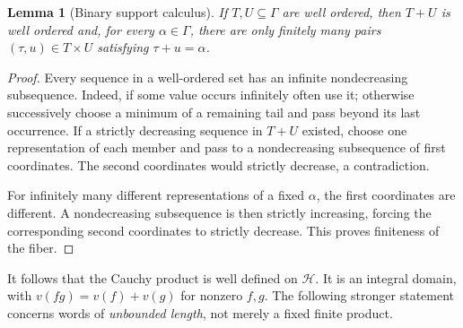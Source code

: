 \documentclass[11pt,a4paper]{article}
\newtheorem{lemma}[theorem]{Lemma}
\theoremstyle{definition}
\theoremstyle{remark}
\newcommand{\HH}{\mathscr H}
\begin{document}
\begin{lemma}[Binary support calculus]\label{lem:binary}
If $T,U\subseteq\Gamma$ are well ordered, then $T+U$ is well ordered and,
for every $\alpha\in\Gamma$, there are only finitely many pairs
$(\tau,u)\in T\times U$ satisfying $\tau+u=\alpha$.
\end{lemma}
\begin{proof}
Every sequence in a well-ordered set has an infinite nondecreasing
subsequence. Indeed, if some value occurs infinitely often use it; otherwise
successively choose a minimum of a remaining tail and pass beyond its last
occurrence. If a strictly decreasing sequence in $T+U$ existed, choose one
representation of each member and pass to a nondecreasing subsequence of
first coordinates. The second coordinates would strictly decrease, a
contradiction.

For infinitely many different representations of a fixed $\alpha$, the
first coordinates are different. A nondecreasing subsequence is then
strictly increasing, forcing the corresponding second coordinates to
strictly decrease. This proves finiteness of the fiber.
\end{proof}

It follows that the Cauchy product is well defined on $\HH$. It is an
integral domain, with $v(fg)=v(f)+v(g)$ for nonzero $f,g$. The following
stronger statement concerns words of \emph{unbounded length}, not merely a
fixed finite product.
\end{document}
